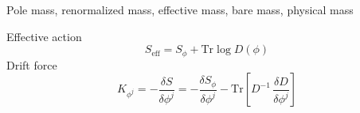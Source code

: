 Pole mass, renormalized mass, effective mass, bare mass, physical mass









Effective action
\begin{equation*}
    S_{\text{eff}} = S_\phi + \text{Tr} \log D(\phi)
\end{equation*}
Drift force
\begin{equation*}
    K_{\phi^j} = - \frac{\delta S}{\delta \phi^j} = - \frac{\delta S_\phi}{\delta \phi^j} - \text{Tr} \left[ D^{-1} \, \frac{\delta D}{\delta \phi^j} \right]
\end{equation*}
